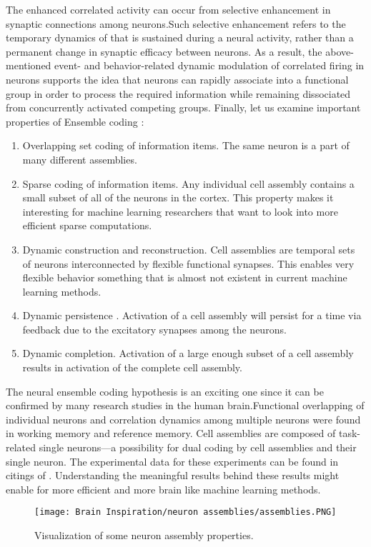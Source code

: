 \documentclass[12pt]{report}
\begin{document}
The enhanced correlated activity can occur from selective enhancement in synaptic connections among neurons.Such selective enhancement refers to the temporary dynamics of that is sustained during a neural activity, rather than a permanent change in synaptic efficacy between neurons. As a result, the above-mentioned event- and behavior-related dynamic modulation of correlated firing in neurons supports the idea that neurons can rapidly associate into a functional group in order to process the required information while remaining dissociated from concurrently activated competing groups. Finally, let us examine important properties of Ensemble coding :
\begin{enumerate}
    \item Overlapping set coding of information items. The same neuron is a part of many different assemblies.
    \item Sparse coding of information items. Any individual cell assembly contains a small subset of all of the neurons in the cortex. This property makes it interesting for machine learning researchers that want to look into more efficient sparse computations.
    \item Dynamic construction and reconstruction. Cell assemblies are temporal sets of neurons interconnected by flexible functional synapses. This enables very flexible behavior something that is almost not existent in current machine learning methods.
    \item Dynamic persistence . Activation of a cell assembly will persist for a time via feedback due to the excitatory synapses among the neurons.
    \item Dynamic completion. Activation of a large enough subset of a cell assembly results in activation of the complete cell assembly.
\end{enumerate}
The neural ensemble coding hypothesis is an exciting one since it can be confirmed by many research studies in the human brain.Functional overlapping of individual neurons and correlation dynamics among multiple neurons were found in working memory and reference memory.
Cell assemblies are composed of task-related single neurons—a possibility for dual coding by cell assemblies and their single neuron. The experimental data for these experiments can be found in citings of \cite{sakurai1999}. Understanding the meaningful results behind these results might enable for more efficient and more brain like machine learning methods.  
\begin{figure}[htp]
    \texttt{[image: Brain Inspiration/neuron assemblies/assemblies.PNG]}
    \caption{Visualization of some neuron assembly properties.}
    \label{fig:assemblies}
\end{figure}
\end{document}
